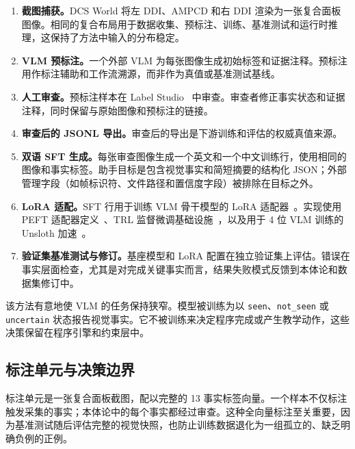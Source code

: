 \begin{enumerate}
\item \textbf{截图捕获。}DCS World 将左 DDI、AMPCD 和右 DDI 渲染为一张复合面板图像。相同的复合布局用于数据收集、预标注、训练、基准测试和运行时推理，这保持了方法中输入的分布稳定。

\item \textbf{VLM 预标注。}一个外部 VLM 为每张图像生成初始标签和证据注释。预标注用作标注辅助和工作流溯源，而非作为真值或基准测试基线。

\item \textbf{人工审查。}预标注样本在 Label Studio~\citep{tkachenko2020labelstudio} 中审查。审查者修正事实状态和证据注释，同时保留与原始图像和预标注的链接。

\item \textbf{审查后的 JSONL 导出。}审查后的导出是下游训练和评估的权威真值来源。

\item \textbf{双语 SFT 生成。}每张审查图像生成一个英文和一个中文训练行，使用相同的图像和事实标签。助手目标是包含视觉事实和简短摘要的结构化 JSON；外部管理字段（如帧标识符、文件路径和置信度字段）被排除在目标之外。

\item \textbf{LoRA 适配。}SFT 行用于训练 VLM 骨干模型的 LoRA 适配器~\citep{hu2021lora}。实现使用 PEFT 适配器定义~\citep{mangrulkar2022peft}、TRL 监督微调基础设施~\citep{vonwerra2020trl}，以及用于 4 位 VLM 训练的 Unsloth 加速~\citep{unsloth2024}。

\item \textbf{验证集基准测试与修订。}基座模型和 LoRA 配置在独立验证集上评估。错误在事实层面检查，尤其是对完成关键事实而言，结果失败模式反馈到本体论和数据集修订中。
\end{enumerate}

该方法有意地使 VLM 的任务保持狭窄。模型被训练为以 \texttt{seen}、\texttt{not\_seen} 或 \texttt{uncertain} 状态报告视觉事实。它不被训练来决定程序完成或产生教学动作，这些决策保留在程序引擎和约束层中。

\subsection{标注单元与决策边界}

标注单元是一张复合面板截图，配以完整的 13 事实标签向量。一个样本不仅标注触发采集的事实；本体论中的每个事实都经过审查。这种全向量标注至关重要，因为基准测试随后评估完整的视觉快照，也防止训练数据退化为一组孤立的、缺乏明确负例的正例。

